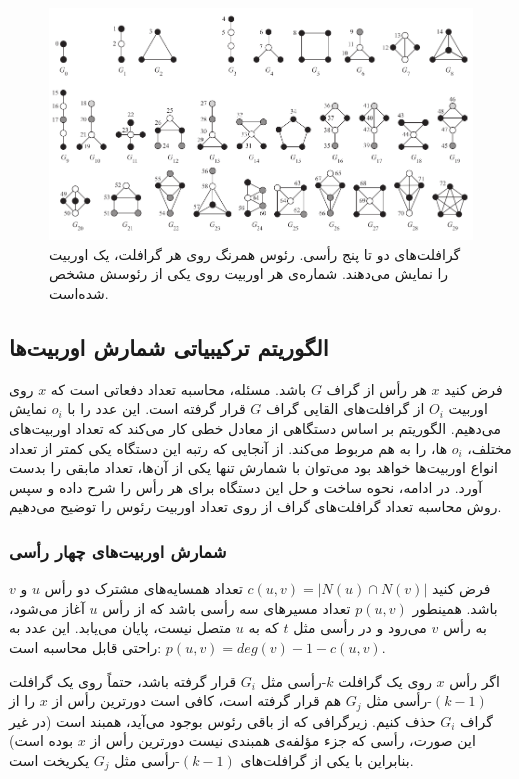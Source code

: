 \begin{figure}[t]
\centering
\includegraphics[scale=0.4]{./graphlets.png}
\caption{گرافلت‌های دو تا پنج رأسی. رئوس همرنگ روی هر گرافلت، یک اوربیت را نمایش می‌دهند. شماره‌ی هر اوربیت روی یکی از رئوسش مشخص شده‌است.}
\label{fig:graphlets}
\end{figure}

\subsection{الگوریتم ترکیبیاتی شمارش اوربیت‌ها}
فرض کنید $x$ هر رأس از گراف $G$ باشد. مسئله، محاسبه تعداد دفعاتی است که $x$  روی اوربیت $O_i$ از گرافلت‌های القایی گراف $G$ قرار گرفته است. این عدد را با $o_i$ نمایش می‌دهیم. الگوریتم بر اساس دستگاهی از معادل خطی کار می‌کند که تعداد اوربیت‌های مختلف، $o_i$ ها، را به هم مربوط می‌کند. از آنجایی که رتبه این دستگاه یکی کمتر از تعداد انواع اوربیت‌ها خواهد بود می‌توان با شمارش تنها یکی از آن‌ها، تعداد مابقی را بدست آورد. در ادامه، نحوه ساخت و حل این دستگاه برای هر رأس را شرح داده و سپس روش محاسبه تعداد گرافلت‌های گراف از روی تعداد اوربیت رئوس را توضیح می‌دهیم.

\subsubsection{شمارش اوربیت‌های چهار رأسی}
فرض کنید $c(u,v) = |N(u) \cap N(v)|$ تعداد همسایه‌های مشترک دو رأس $u$ و $v$ باشد. همینطور $p(u,v)$ تعداد مسیرهای سه رأسی باشد که از رأس $u$ آغاز می‌شود، به رأس $v$ می‌رود و در رأسی مثل $t$ که به $u$ متصل نیست، پایان می‌یابد. این عدد به راحتی قابل محاسبه است: 
$p(u,v) = deg(v) -1 -c(u,v)$.

اگر رأس $x$ روی یک گرافلت $k$-رأسی مثل $G_i$ قرار گرفته باشد، حتماً روی یک گرافلت $(k-1)$-رأسی مثل $G_j$ هم قرار گرفته است، کافی است دورترین رأس از $x$ را از گراف $G_i$ حذف کنیم. زیرگرافی که از باقی رئوس بوجود می‌آید، همبند است (در غیر این صورت، رأسی که جزء مؤلفه‌ی همبندی نیست دورترین رأس از $x$ بوده است) بنابراین با یکی از گرافلت‌های $(k-1)$-رأسی مثل $G_j$ یکریخت است.

